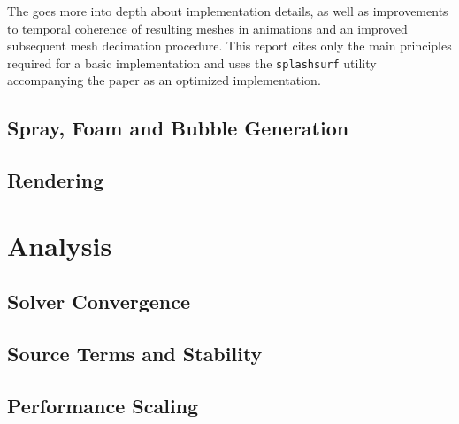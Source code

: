\documentclass[oneside, a4paper]{book}
\begin{document}
  The \autocite[original paper]{laplacian-surf-reconst} goes more into depth about implementation details, as well as improvements to temporal coherence of resulting meshes in animations and an improved subsequent mesh decimation procedure. This report cites only the main principles required for a basic implementation and uses the \texttt{splashsurf} utility accompanying the paper as an optimized implementation.

  \section{Spray, Foam and Bubble Generation}
    \newpage
    \section{Rendering}
\chapter{Analysis}\label{chp:analysis}
    \section{Solver Convergence}
    \section{Source Terms and Stability}
    \section{Performance Scaling}
\end{document}
